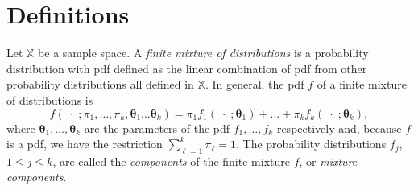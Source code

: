 \documentclass[10pt, a4paper]{article}
\newtheorem{prob}{Problem}
\newcommand{\m}[1]{\boldsymbol{#1}}
\begin{document}





% 
%

\section{Definitions}
\label{definitions}

Let $\mathbb{X}$ be a sample space. A \emph{finite mixture of distributions} is a probability distribution with pdf defined as the linear combination of pdf from other probability distributions all defined in $\mathbb{X}$. In general, the pdf $f$ of a finite mixture of distributions is
\begin{equation}\label{mixt}
f(\;\cdot\; ; \pi_1, \dots, \pi_k, \m\theta_1 \dots \m\theta_k) = \pi_1 f_1(\;\cdot\; ; \m\theta_1) + \dots + \pi_k f_k(\;\cdot\; ; \m\theta_k),
\end{equation}
where $\m\theta_1, \dots,  \m\theta_k$ are the parameters of the pdf $f_1, \dots, f_k$ respectively and, because $f$ is a pdf, we have the restriction $\sum_{\ell = 1}^k \pi_\ell = 1$. The probability distributions $f_j$, $1 \leq j \leq k$, are called the \emph{components} of the finite mixture $f$, or \emph{mixture components}.
\end{document}
